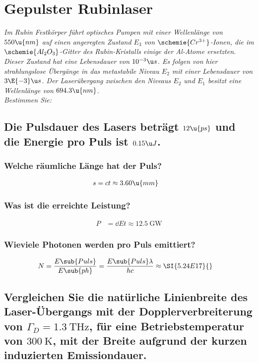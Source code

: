 \documentclass[ex]{exercise_4.1}
\begin{document}
\section{Gepulster Rubinlaser}
{\it Im Rubin Festkörper führt optisches Pumpen mit einer Wellenlänge von \(550\u{nm}\) auf einen angeregten Zustand \(E_3\) von \(\schemie{Cr^{3+}}\)-Ionen, die im \(\schemie{Al_2O_3}\)-Gitter des Rubin-Kristalls einige der Al-Atome ersetzten. Dieser Zustand hat eine Lebensdauer von \(10^{-3}\u s \). Es folgen von hier strahlungslose Übergänge in das metastabile Niveau \(E_2\) mit einer Lebensdauer von \(3\E{-3}\u s\). Der Laserübergang zwischen den Niveaus \(E_2\) und \(E_1\) besitzt eine Wellenlänge von \(694.3\u{nm}\).\\
Bestimmen Sie:
}

\subsection{Die Pulsdauer des Lasers beträgt \(12\u{ps}\) und die Energie pro Puls ist \(0.15\u J\).}

\subsubsection{Welche räumliche Länge hat der Puls?}
\begin{align*}
    s &=  c t \approx 3.60\u{mm}
\end{align*}

\subsubsection{Was ist die erreichte Leistung?}
\begin{align*}
    P &= \dd Et \approx \SI{12.5}{\GW}
\end{align*}

\subsubsection{Wieviele Photonen werden pro Puls emittiert?}
\begin{align*}
    N &= \frac{E\sub{Puls}}{E\sub{ph}} 
    = \frac{E\sub{Puls}\lambda}{h c}
    \approx \SI{5.24E17}{}
\end{align*}


\subsection{Vergleichen Sie die natürliche Linienbreite des Laser-Übergangs mit der Dopplerverbreiterung von \(\Gamma_D=\SI{1.3}{\THz}\), für eine Betriebstemperatur von \(\SI{300}\K\), mit der Breite aufgrund der kurzen induzierten Emissiondauer.}
\end{document}
